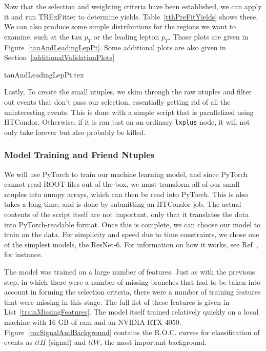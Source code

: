     Now that the selection and weighting criteria have been established, we can apply it and run TRExFitter to determine yields. Table~\ref{tthPreFitYields} shows these. We can also produce some simple distributions for the regions we want to examine, such at the tau $p_T$ or the leading lepton $p_T$. Those plots are given in Figure~\ref{tauAndLeadingLepPt}. Some additional plots are also given in Section~\ref{additionalValidationPlots}

    {tauAndLeadingLepPt.tex}

    

    Lastly, To create the small ntuples, we skim through the raw ntuples and filter out events that don't pass our selection, essentially getting rid of all the uninteresting events. This is done with a simple script that is parallelized using HTCondor. Otherwise, if it is ran just on an ordinary \texttt{lxplus} node, it will not only take forever but also probably be killed.


\subsubsection{Model Training and Friend Ntuples}
    We will use PyTorch to train our machine learning model, and since PyTorch cannot read ROOT files out of the box, we must transform all of our small ntuples into numpy arrays, which can then be read into PyTorch. This is also takes a long time, and is done by submitting an HTCondor job. The actual contents of the script itself are not important, only that it translates the data into PyTorch-readable format. Once this is complete, we can choose our model to train on the data. For simplicity and speed due to time constraints, we chose one of the simplest models, the ResNet-6. For information on how it works, see Ref~\cite{resnet}, for instance.

    The model was trained on a large number of features. Just as with the previous step, in which there were a number of missing branches that had to be taken into account in forming the selection criteria, there were a number of training features that were missing in this stage. The full list of these features is given in List~\ref{trainMissingFeatures}. The model itself trained relatively quickly on a local machine with 16 GB of ram and an NVIDIA RTX 4050. Figure~\ref{rocSignalAndBackground} contains the R.O.C. curves for classification of events as $t\bar{t}H$ (signal) and $t\bar{t}W$, the most important background.

